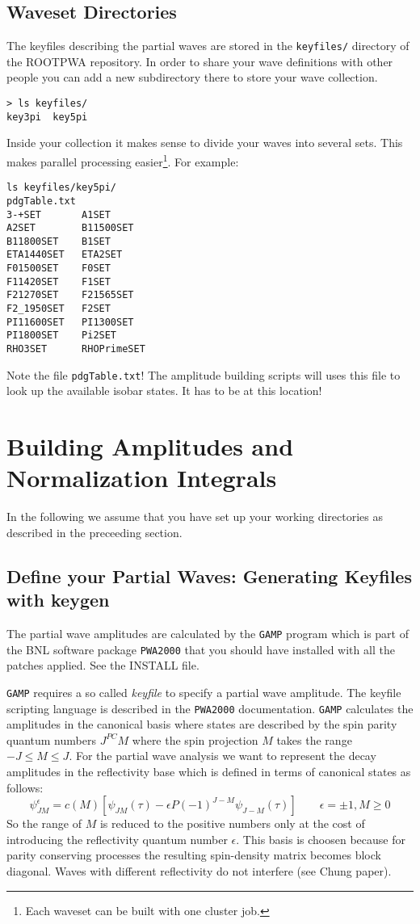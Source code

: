 \documentclass[12pt,a4paper]{article}
\begin{document}
{\subsection{Waveset Directories}
The keyfiles describing the partial waves are stored in the {\tt keyfiles/} directory of the ROOTPWA repository. In order to share your wave definitions with other people you can add a new subdirectory there to store your wave collection.
\begin{verbatim}
> ls keyfiles/
key3pi  key5pi
\end{verbatim}
Inside your collection it makes sense to divide your waves into several sets. This makes parallel processing easier\footnote{Each waveset can be built with one cluster job.}. For example:
\begin{verbatim}
ls keyfiles/key5pi/
pdgTable.txt
3-+SET       A1SET
A2SET        B11500SET
B11800SET    B1SET
ETA1440SET   ETA2SET
F01500SET    F0SET
F11420SET    F1SET
F21270SET    F21565SET
F2_1950SET   F2SET
PI11600SET   PI1300SET
PI1800SET    Pi2SET
RHO3SET      RHOPrimeSET
\end{verbatim}
Note the file {\tt pdgTable.txt}! The amplitude building scripts will uses this file to look up the available isobar states. It has to be at this location!

\section{Building Amplitudes and Normalization Integrals}
In the following we assume that you have set up your working directories as described in the preceeding section.

\subsection{Define your Partial Waves: Generating Keyfiles with keygen}
The partial wave amplitudes are calculated by the {\tt GAMP} program which is part of the BNL software package {\tt PWA2000} that you should have installed with all the patches applied. See the INSTALL file.

{\tt GAMP} requires a so called {\it keyfile} to specify a partial wave amplitude. The keyfile scripting language is described in the {\tt PWA2000} documentation. {\tt GAMP} calculates the amplitudes in the canonical basis where states are described by the spin parity quantum numbers $J^{PC}M$ where the spin projection $M$ takes the range $-J \leq M \leq J$. For the partial wave analysis we want to represent the decay amplitudes in the reflectivity base which is defined in terms of canonical states as follows:
\[\psi_{JM}^\epsilon = c(M)[\psi_{JM}(\tau)-\epsilon P(-1)^{J-M}\psi_{J-M}(\tau)]\quad\quad \epsilon=\pm1, M\geq0\]
So the range of $M$ is reduced to the positive numbers only at the cost of introducing the reflectivity quantum number $\epsilon$. This basis is choosen because for parity conserving processes the resulting spin-density matrix becomes block diagonal. Waves with different reflectivity do not interfere (see Chung paper).

}
\end{document}
